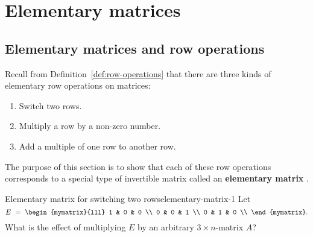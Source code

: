 \section{Elementary matrices}

\subsection{Elementary matrices and row operations}

Recall from Definition~\ref{def:row-operations} that there are three
kinds of elementary row operations on matrices:
\begin{enumerate}
\item Switch two rows.
\item Multiply a row by a non-zero number.
\item Add a multiple of one row to another row.
\end{enumerate}
The purpose of this section is to show that each of these row
operations corresponds to a special type of invertible matrix called
an \textbf{elementary matrix}%
.

\begin{example}{Elementary matrix for switching two rows}{elementary-matrix-1}
  Let
  \begin{equation*}
    E ~=~ \begin{mymatrix}{lll}
      1 & 0 & 0 \\
      0 & 0 & 1 \\
      0 & 1 & 0 \\
    \end{mymatrix}.
  \end{equation*}
  What is the effect of multiplying $E$ by an arbitrary $3\times
  n$-matrix $A$?
\end{example}

